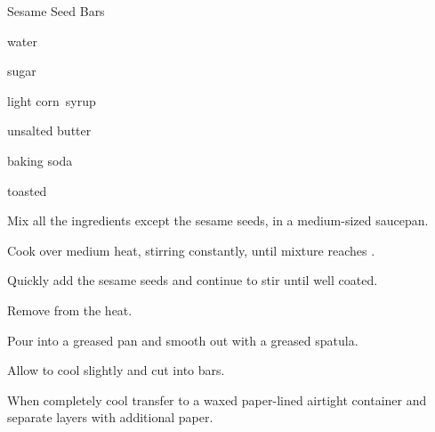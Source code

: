 \begin{recipe}{Sesame Seed Bars}{}{}

\begin{ingredients}
\item {} water
\item {} sugar
\item {} light corn~syrup
\item {} unsalted butter
\item \tp{\quarter} baking soda
\item {} toasted 
\end{ingredients}

\begin{directions}
\item Mix all the ingredients except the sesame seeds, in a medium-sized saucepan.
\item Cook over medium heat, stirring constantly, until mixture reaches .
\item Quickly add the sesame seeds and continue to stir until well coated.
\item Remove from the heat.
\item Pour into a greased pan and smooth out with a greased spatula.
\item Allow to cool slightly and cut into bars.
\item When completely cool transfer to a waxed paper-lined airtight container and separate layers with additional paper.
\end{directions}
\end{recipe}
